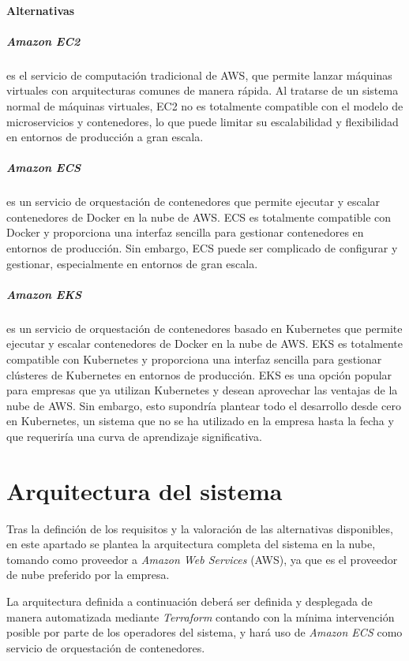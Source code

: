 \paragraph{Alternativas}
\subparagraph{Amazon EC2} es el servicio de computación tradicional de AWS, que
permite lanzar máquinas virtuales con arquitecturas comunes de manera rápida.
Al tratarse de un sistema normal de máquinas virtuales, EC2 no es totalmente
compatible con el modelo de microservicios y contenedores, lo que puede limitar
su escalabilidad y flexibilidad en entornos de producción a gran escala.

\subparagraph{Amazon ECS} es un servicio de orquestación de contenedores que
permite ejecutar y escalar contenedores de Docker en la nube de AWS. ECS es
totalmente compatible con Docker y proporciona una interfaz sencilla para
gestionar contenedores en entornos de producción. Sin embargo, ECS puede ser
complicado de configurar y gestionar, especialmente en entornos de gran escala.

\subparagraph{Amazon EKS} es un servicio de orquestación de contenedores basado
en Kubernetes que permite ejecutar y escalar contenedores de Docker en la nube
de AWS. EKS es totalmente compatible con Kubernetes y proporciona una interfaz
sencilla para gestionar clústeres de Kubernetes en entornos de producción. EKS
es una opción popular para empresas que ya utilizan Kubernetes y desean
aprovechar las ventajas de la nube de AWS. Sin embargo, esto supondría plantear
todo el desarrollo desde cero en Kubernetes, un sistema que no se ha utilizado
en la empresa hasta la fecha y que requeriría una curva de aprendizaje
significativa.



\newpage{}
\section{Arquitectura del sistema}\label{sec:arquitectura}
Tras la definción de los requisitos y la valoración de las alternativas
disponibles, en este apartado se plantea la arquitectura completa del sistema
en la nube, tomando como proveedor a \textit{Amazon Web Services} (AWS), ya que
es el proveedor de nube preferido por la empresa.

La arquitectura definida a continuación deberá ser definida y desplegada de
manera automatizada mediante \textit{Terraform} contando con la mínima
intervención posible por parte de los operadores del sistema, y hará uso de
\textit{Amazon ECS} como servicio de orquestación de contenedores.

